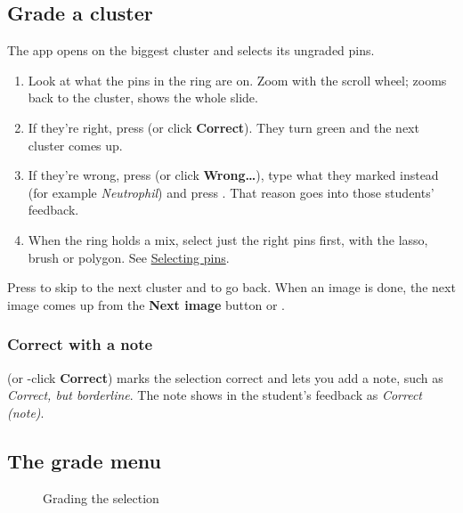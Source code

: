 \subsection{Grade a cluster}\label{sec:grading:grade-a-cluster}

The app opens on the biggest cluster and selects its ungraded pins.

\begin{enumerate}[topsep=2pt, itemsep=2pt]
\item Look at what the pins in the ring are on. Zoom with the scroll wheel;  zooms back to the cluster,  shows the whole slide.
\item If they're right, press  (or click \textbf{Correct}). They turn green and the next cluster comes up.
\item If they're wrong, press  (or click \textbf{Wrong\ldots{}}), type what they marked instead (for example \emph{Neutrophil}) and press \keycap{\returnsym{}}. That reason goes into those students' feedback.
\item When the ring holds a mix, select just the right pins first, with the lasso, brush or polygon. See \hyperref[sec:selecting]{Selecting pins}.
\end{enumerate}

Press \keycap{]} to skip to the next cluster and \keycap{[} to go back. When an image is done, the next image comes up from the \textbf{Next image} button or \keycap{\cmdsym{}}\keyplus{}\keycap{\ensuremath{\rightarrow}}.

\subsubsection{Correct with a note}\label{sec:grading:correct-with-a-note}

\keycap{\shiftsym{}}\keyplus{} (or \shiftsym{}-click \textbf{Correct}) marks the selection correct and lets you add a note, such as \emph{Correct, but borderline}. The note shows in the student's feedback as \emph{Correct (note)}.

\subsection[The grade menu\alsotoc{sec:grading:reasons-for-wrong-answers}{Reasons for wrong answers}]{The grade menu}\label{sec:grading:the-grade-menu}

\begin{figure}[H]\centering
{}\hspace{0.06\linewidth}%
\caption{Grading the selection}\label{fig:grade}
\end{figure}

